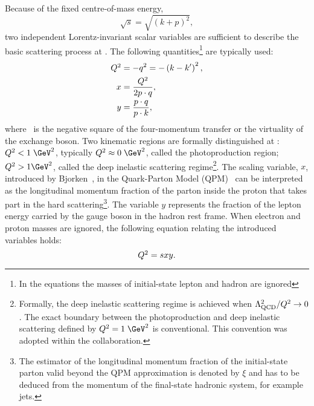 Because of the fixed centre-of-mass energy, 
\begin{equation}
\sqrt{s}=\sqrt{\left(k+p\right)^2},
\end{equation} 
two independent Lorentz-invariant scalar variables are sufficient to describe the basic scattering process at \hera. The following quantities\footnote{In the equations the masses of initial-state lepton and hadron are ignored} are typically used:
\begin{align}
\mbox{${Q^2}$} &= -q^2 = -\left( k - k' \right)^2,\\
     x &= \frac{\mbox{${Q^2}$}}{2p\cdot q},\label{eq:vardefinitxbj}\\
		 y &= \frac{p\cdot q}{p\cdot k},\label{eq:vardefinitinelast}
\end{align}
where \qsq\, is the negative square of the four-momentum transfer or the virtuality of the exchange boson. Two kinematic regions are formally distinguished at \hera: $\qsq < 1\;\GeV^2$, typically $\qsq \approx 0\;\GeV^2$, called the photoproduction region; $\qsq > 1 \GeV^2$, called the deep inelastic scattering regime\footnote{Formally, the deep inelastic scattering regime is achieved when $\Lambda_\text{QCD}^2/\mbox{${Q^2}$} \rightarrow 0$. The exact boundary between the photoproduction and deep inelastic scattering defined by $\qsq = 1\;\GeV^2$ is  conventional. This convention was adopted within the \zeus collaboration.}. The scaling variable, $x$, introduced by Bjorken~\cite{Bjorken:1968dy}, in the Quark-Parton Model (QPM)~\cite{Feynman:1969ej,Feynman:1973xc} can be interpreted as the longitudinal momentum fraction of the parton inside the proton that takes part in the hard scattering\footnote{The estimator of the longitudinal momentum fraction of the initial-state parton valid beyond the QPM approximation is denoted by $\xi$ and has to be deduced from the momentum of the final-state hadronic system, for example jets.}. The variable $y$ represents the fraction of the lepton energy carried by the gauge boson in the hadron rest frame. When electron and proton masses are ignored, the following equation relating the introduced variables holds:
\begin{equation}
\mbox{${Q^2}$} = sxy.
\label{eq:qsxy}
\end{equation}

